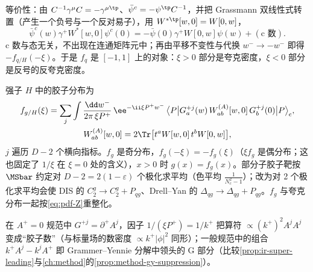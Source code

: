 等价性：由 $C^{-1}\gamma^\mu C=-\gamma^{\mu\tp}$、$\bar\psi^c=-\psi^{\tp}C^{-1}$，并把 Grassmann 双线性式转置（产生一个负号与一个反对易子），用 $W^{*\tp}[w,0]=W[0,w]$，
\begin{equation}\label{eq:pdf-cconj}
\bar\psi^c(w)\gamma^+W^*[w,0]\psi^c(0)=-\bar\psi(0)\gamma^+W[0,w]\psi(w)+(\text{c 数}).
\end{equation}
c 数与态无关，不出现在连通矩阵元中；再由平移不变性与代换 $w^-\to-w^-$ 即得 $-f_{q/H}(-\xi)$。于是 $f_q$ 是 $[-1,1]$ 上的对象：$\xi>0$ 部分是夸克密度，$\xi<0$ 部分是反号的反夸克密度。

\begin{definition}[胶子分布]\label{def:pdf-gluon}
强子 $H$ 中的胶子分布为
\begin{equation}\label{eq:pdf-fg}
\begin{gathered}
f_{g/H}(\xi)=\sum_{j}\int\frac{\dd w^-}{2\pi\,\xi P^+}\,\ee^{-\ii\xi P^+w^-}\,\big\langle P\big|G^{+j}_a(w)\,W^{(A)}_{ab}[w,0]\,G^{+j}_b(0)\big|P\big\rangle_{\mathrm c},\\
W^{(A)}_{ab}[w,0]=2\Tr\big[t^aW[w,0]\,t^bW[0,w]\big],
\end{gathered}
\end{equation}
$j$ 遍历 $D-2$ 个横向指标。$f_g$ 是奇分布，$f_g(-\xi)=-f_g(\xi)$（$\xi f_g$ 是偶分布；这也固定了 $1/\xi$ 在 $\xi=0$ 处的含义），$x>0$ 时 $g(x)=f_g(x)$。部分子胶子靶按 $\MSbar$ 约定对 $D-2=2(1-\varepsilon)$ 个极化求平均（色平均 $\frac1{N_c^2-1}$）；改为对 2 个极化求平均会使 DIS 的 $C_2^g\to C_2^g+P_{qg}$、Drell--Yan 的 $\Delta_{qg}\to\Delta_{qg}+P_{qg}$。$f_g$ 与夸克分布一起按\cref{eq:pdf-Z}重整化。
\end{definition}

在 $A^+=0$ 规范中 $G^{+j}=\partial^+A^j$，因子 $1/(\xi P^+)=1/k^+$ 把算符 $\propto(k^+)^2A^jA^j$ 变成“胶子数”（与标量场的数密度 $\propto k^+|\phi|^2$ 同形）；一般规范中的组合 $k^+A^j-k^jA^+$ 即 Grammer--Yennie 分解中领头的 G 部分（比较\cref{prop:ir-super-leading}与\cref{ch:method}的\cref{prop:method-gy-suppression}）。
